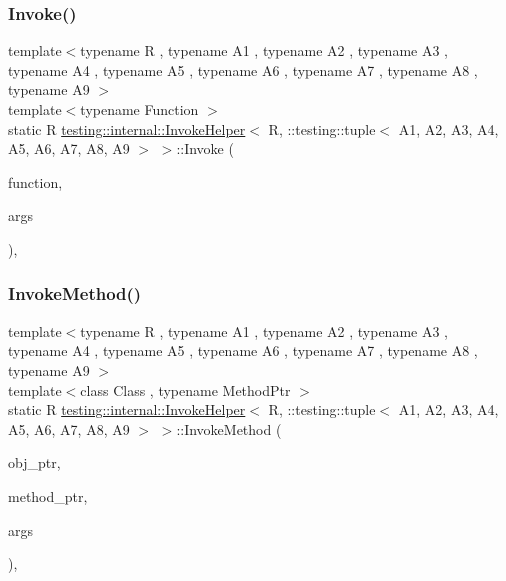 \subsubsection{\texorpdfstring{Invoke()}{Invoke()}}
{\footnotesize\ttfamily template$<$typename R , typename A1 , typename A2 , typename A3 , typename A4 , typename A5 , typename A6 , typename A7 , typename A8 , typename A9 $>$ \\
template$<$typename Function $>$ \\
static R \mbox{\hyperlink{classtesting_1_1internal_1_1_invoke_helper}{testing\+::internal\+::\+Invoke\+Helper}}$<$ R, \+::testing\+::tuple$<$ A1, A2, A3, A4, A5, A6, A7, A8, A9 $>$ $>$\+::Invoke (\begin{DoxyParamCaption}\item[{\mbox{\hyperlink{structtesting_1_1internal_1_1_function}{Function}}}]{function,  }\item[{const \+::testing\+::tuple$<$ A1, A2, A3, A4, A5, A6, A7, A8, A9 $>$ \&}]{args }\end{DoxyParamCaption})\hspace{0.3cm}{\ttfamily [inline]}, {\ttfamily [static]}}

\mbox{\label{classtesting_1_1internal_1_1_invoke_helper_3_01_r_00_01_1_1testing_1_1tuple_3_01_a1_00_01_a2_00_cb3e0694d0722fcc616ae618dc383e5b_ab468cf4a3e1ff2fa33a60ce3459c17f7}} 
\subsubsection{\texorpdfstring{InvokeMethod()}{InvokeMethod()}}
{\footnotesize\ttfamily template$<$typename R , typename A1 , typename A2 , typename A3 , typename A4 , typename A5 , typename A6 , typename A7 , typename A8 , typename A9 $>$ \\
template$<$class Class , typename Method\+Ptr $>$ \\
static R \mbox{\hyperlink{classtesting_1_1internal_1_1_invoke_helper}{testing\+::internal\+::\+Invoke\+Helper}}$<$ R, \+::testing\+::tuple$<$ A1, A2, A3, A4, A5, A6, A7, A8, A9 $>$ $>$\+::Invoke\+Method (\begin{DoxyParamCaption}\item[{Class $\ast$}]{obj\+\_\+ptr,  }\item[{Method\+Ptr}]{method\+\_\+ptr,  }\item[{const \+::testing\+::tuple$<$ A1, A2, A3, A4, A5, A6, A7, A8, A9 $>$ \&}]{args }\end{DoxyParamCaption})\hspace{0.3cm}{\ttfamily [inline]}, {\ttfamily [static]}}



